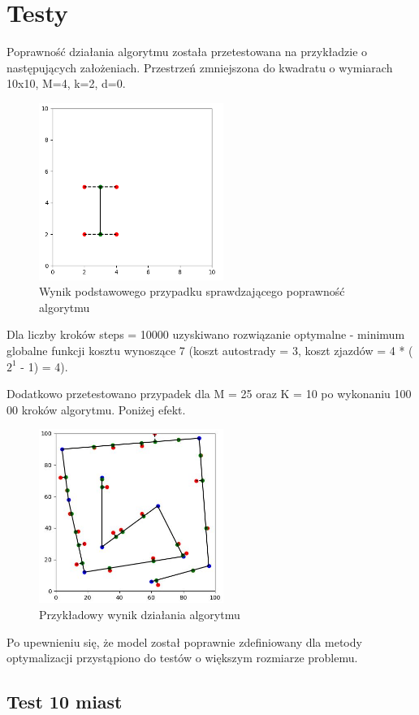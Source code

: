 \documentclass[a4paper]{article}
\begin{document}
\section{Testy}
Poprawność działania algorytmu została przetestowana na przykładzie o następujących założeniach. Przestrzeń zmniejszona do kwadratu o wymiarach 10x10, M=4, k=2, d=0.
\begin{figure}[h!]
\centering
\includegraphics[width=6cm]{test}
\caption{Wynik podstawowego przypadku sprawdzającego poprawność algorytmu}
\end{figure}\newline
Dla liczby kroków steps = 10000 uzyskiwano rozwiązanie optymalne - minimum globalne funkcji kosztu wynoszące 7 (koszt autostrady = 3, koszt zjazdów = 4 * ($2^1$ - 1) = 4).\newline

Dodatkowo przetestowano przypadek dla M = 25 oraz K = 10 po wykonaniu 100 00 kroków algorytmu. Poniżej efekt.
\begin{figure}[h!]
\centering
\includegraphics[width=6cm]{test2}
\caption{Przykładowy wynik działania algorytmu}
\end{figure}\newline
Po upewnieniu się, że model został poprawnie zdefiniowany dla metody optymalizacji przystąpiono do testów o większym rozmiarze problemu.

\subsection{Test 10 miast}
\end{document}
